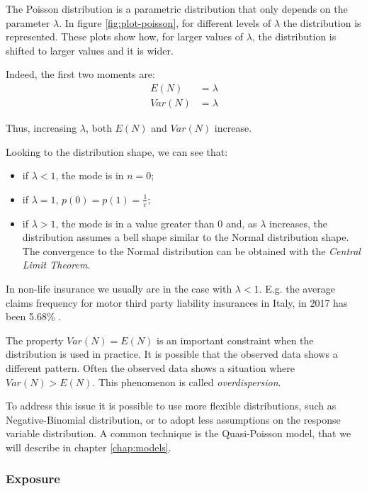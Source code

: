 \documentclass[a4paper, twoside, openright, 12pt]{report}
\providecommand{\tightlist}{%
  \setlength{\itemsep}{0pt}\setlength{\parskip}{0pt}}
\theoremstyle{definition}
\theoremstyle{definition}
\theoremstyle{definition}
\theoremstyle{remark}
\begin{document}
The Poisson distribution is a parametric distribution that only depends on the parameter \(\lambda\). In figure \ref{fig:plot-poisson}, for different levels of \(\lambda\) the distribution is represented. These plots show how, for larger values of \(\lambda\), the distribution is shifted to larger values and it is wider.

Indeed, the first two moments are:
\begin{align*}
E(N)   & = \lambda \\
Var(N) & = \lambda
\end{align*}

Thus, increasing \(\lambda\), both \(E(N)\) and \(Var(N)\) increase.

Looking to the distribution shape, we can see that:

\begin{itemize}
\tightlist
\item
  if \(\lambda<1\), the mode is in \(n=0\);
\item
  if \(\lambda=1\), \(p(0)=p(1)=\frac{1}{e}\);
\item
  if \(\lambda>1\), the mode is in a value greater than \(0\) and, as \(\lambda\) increases, the distribution assumes a bell shape similar to the Normal distribution shape. The convergence to the Normal distribution can be obtained with the \emph{Central Limit Theorem}.
\end{itemize}

In non-life insurance we usually are in the case with \(\lambda<1\). E.g. the average claims frequency for motor third party liability insurances in Italy, in 2017 has been 5.68\% \autocite{ania-claim-freq}.

The property \(Var(N) = E(N)\) is an important constraint when the distribution is used in practice. It is possible that the observed data shows a different pattern. Often the observed data shows a situation where \(Var(N) > E(N)\). This phenomenon is called \emph{overdispersion}.

To address this issue it is possible to use more flexible distributions, such as Negative-Binomial distribution, or to adopt less assumptions on the response variable distribution. A common technique is the Quasi-Poisson model, that we will describe in chapter \ref{chap:models}.

\hypertarget{chap:exposure}{%
\subsubsection{Exposure}\label{chap:exposure}}
\end{document}
